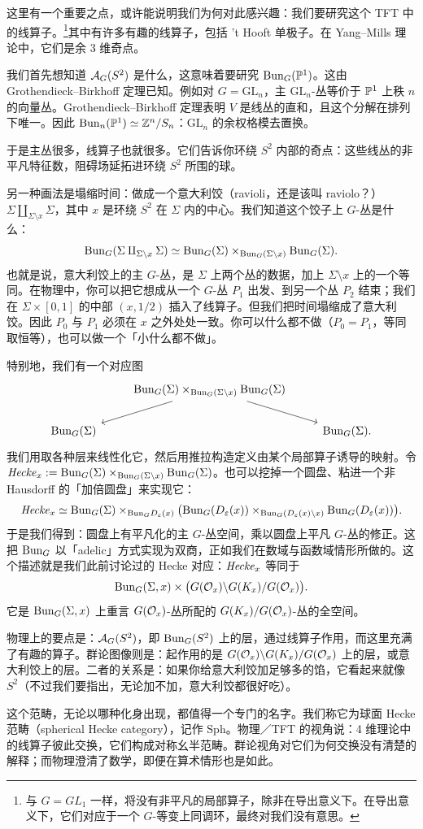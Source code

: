 这里有一个重要之点，或许能说明我们为何对此感兴趣：我们要研究这个 TFT 中的线算子。\footnote{与 $G=GL_1$ 一样，将没有非平凡的局部算子，除非在导出意义下。在导出意义下，它们对应于一个 $G$-等变上同调环，最终对我们没有意思。}其中有许多有趣的线算子，包括 't Hooft 单极子。在 Yang–Mills 理论中，它们是余 3 维奇点。

我们首先想知道 $\cA_G(S^2)$ 是什么，这意味着要研究 $\Bun_G(\P^1)$。这由 Grothendieck–Birkhoff 定理已知。例如对 $G=\mathrm{GL}_n$，主 $\mathrm{GL}_n$-丛等价于 $\P^1$ 上秩 $n$ 的向量丛。Grothendieck–Birkhoff 定理表明 $V$ 是线丛的直和，且这个分解在排列下唯一。因此 $\Bun_n(\P^1)\simeq\Z^n/S_n$：$\mathrm{GL}_n$ 的余权格模去置换。

于是主丛很多，线算子也就很多。它们告诉你环绕 $S^2$ 内部的奇点：这些线丛的非平凡特征数，阻碍场延拓进环绕 $S^2$ 所围的球。

另一种画法是塌缩时间：做成一个意大利饺（ravioli，还是该叫 raviolo？）$\Sigma\amalg_{\Sigma\setminus x}\Sigma$，其中 $x$ 是环绕 $S^2$ 在 $\Sigma$ 内的中心。我们知道这个饺子上 $G$-丛是什么：
\[
  \Bun_G(\Sigma\amalg_{\Sigma\setminus x}\Sigma)
  \simeq \Bun_G(\Sigma)\times_{\Bun_G(\Sigma\setminus x)}\Bun_G(\Sigma).
\]
也就是说，意大利饺上的主 $G$-丛，是 $\Sigma$ 上两个丛的数据，加上 $\Sigma\setminus x$ 上的一个等同。在物理中，你可以把它想成从一个 $G$-丛 $P_1$ 出发、到另一个丛 $P_2$ 结束；我们在 $\Sigma\times[0,1]$ 的中部 $(x,1/2)$ 插入了线算子。但我们把时间塌缩成了意大利饺。因此 $P_0$ 与 $P_1$ 必须在 $x$ 之外处处一致。你可以什么都不做（$P_0=P_1$，等同取恒等），也可以做一个「小什么都不做」。

特别地，我们有一个对应图
\[
  \begin{tikzcd}
    & \Bun_G(\Sigma)\times_{\Bun_G(\Sigma\setminus x)}\Bun_G(\Sigma) \arrow[dl] \arrow[dr] & \\
    \Bun_G(\Sigma) & & \Bun_G(\Sigma).
  \end{tikzcd}
\]
我们用取各种层来线性化它，然后用推拉构造定义由某个局部算子诱导的映射。令 $\Hck_x := \Bun_G(\Sigma)\times_{\Bun_G(\Sigma\setminus x)}\Bun_G(\Sigma)$。也可以挖掉一个圆盘、粘进一个非 Hausdorff 的「加倍圆盘」来实现它：
\[
  \Hck_x \simeq \Bun_G(\Sigma)\times_{\Bun_G D_\varepsilon(x)}
  \bigl(\Bun_G(D_\varepsilon(x))\times_{\Bun_G(D_\varepsilon(x)\setminus x)}\Bun_G(D_\varepsilon(x))\bigr).
\]
于是我们得到：圆盘上有平凡化的主 $G$-丛空间，乘以圆盘上平凡 $G$-丛的修正。这把 $\Bun_G$ 以「adelic」方式实现为双商，正如我们在数域与函数域情形所做的。这个描述就是我们此前讨论过的 Hecke 对应：$\Hck_x$ 等同于
\[
  \Bun_G(\Sigma,x)\times\bigl(G(\cO_x)\backslash G(K_x)/G(\cO_x)\bigr).
\]
它是 $\Bun_G(\Sigma,x)$ 上重言 $G(\cO_x)$-丛所配的 $G(K_x)/G(\cO_x)$-丛的全空间。

物理上的要点是：$\cA_G(S^2)$，即 $\Bun_G(S^2)$ 上的层，通过线算子作用，而这里充满了有趣的算子。群论图像则是：起作用的是 $G(\cO_x)\backslash G(K_x)/G(\cO_x)$ 上的层，或意大利饺上的层。二者的关系是：如果你给意大利饺加足够多的馅，它看起来就像 $S^2$（不过我们要指出，无论加不加，意大利饺都很好吃）。

这个范畴，无论以哪种化身出现，都值得一个专门的名字。我们称它为球面 Hecke 范畴（spherical Hecke category），记作 $\mathrm{Sph}$。物理／TFT 的视角说：4 维理论中的线算子彼此交换，它们构成对称幺半范畴。群论视角对它们为何交换没有清楚的解释；而物理澄清了数学，即便在算术情形也是如此。

